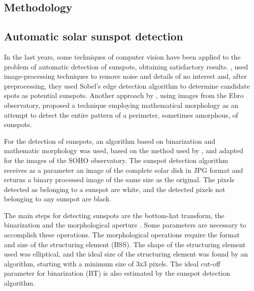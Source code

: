 \documentclass[namedreferences]{solarphysics}
\begin{document}
\begin{article}
\section{Methodology} %
      \label{S-meth}      

\subsection{Automatic solar sunspot detection} %
  \label{S-detect}
In the last years, some techniques of computer vision have been applied to the problem of automatic detection of sunspots, obtaining satisfactory results.
\citealp{zharkov2005}, used image-processing techniques to remove noise and details of no interest and,
after preprocessing, they used Sobel's edge detection algorithm to determine candidate spots as potential sunspots.
Another approach by \citealp{curto2008},
using images from the Ebro observatory, proposed a technique employing mathematical morphology as an attempt to detect the entire pattern of a perimeter, sometimes amorphous, of sunspots.

For the detection of sunspots, an algorithm based on binarization and mathematic morphology was used,
based on the method used by \citealp{curto2008},
and adapted for the images of the SOHO observatory.
The sunspot detection algorithm receives as a parameter an image of the complete solar disk in JPG format and returns a binary processed image of the same size as the original.
The pixels detected as belonging to a sunspot are white,
and the detected pixels not belonging to any sunspot are black.

The main steps for detecting sunspots are the bottom-hat transform, the binarization and the morphological aperture \citep{spagiari2012}.
Some parameters are necessary to accomplish these operations.
The morphological operations require the format and size of the structuring element (BSS).
The shape of the structuring element used was elliptical,
and the ideal size of the structuring element was found by an algorithm, 
starting with a minimum size of 3x3 pixels.
The ideal cut-off parameter for binarization (BT) is also estimated by the sunspot detection algorithm.


\end{article}
\end{document}
